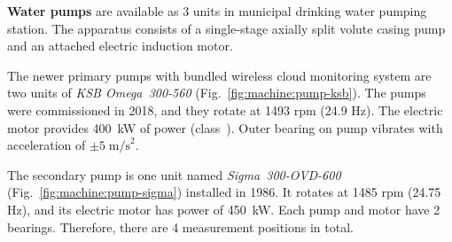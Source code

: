 \textbf{Water pumps} are available as 3 units in municipal drinking water pumping station. The apparatus consists of a single-stage axially split volute casing pump and an attached electric induction motor. 

The newer primary pumps with bundled wireless cloud monitoring system are two units of \emph{KSB Omega~300-560} (Fig.~\ref{fig:machine:pump-ksb}). The pumps were commissioned in 2018, and they rotate at 1493 rpm (24.9 Hz). The electric motor provides 400~kW of power (class~). Outer bearing on pump vibrates with acceleration of $\pm 5 \;\mathrm{m/s}^2$. 

The secondary pump is one unit named \emph{Sigma~300-OVD-600} (Fig.~\ref{fig:machine:pump-sigma}) installed in 1986. It rotates at 1485 rpm (24.75 Hz), and its electric motor has power of 450~kW. Each pump and motor have 2 bearings. Therefore, there are 4 measurement positions in total.

